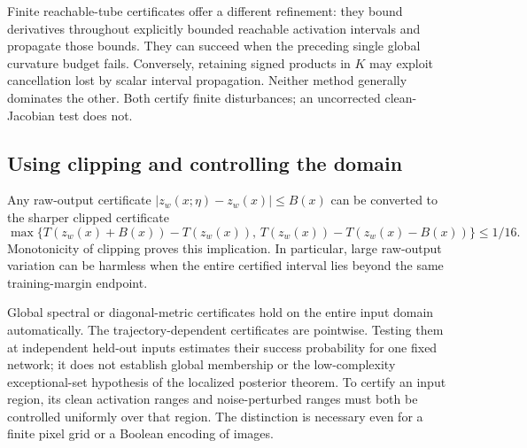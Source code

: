 Finite reachable-tube certificates offer a different refinement:
they bound derivatives throughout explicitly bounded reachable activation
intervals and propagate those bounds. They can succeed when the preceding
single global curvature budget fails. Conversely, retaining signed
products in $K$ may exploit cancellation lost by scalar interval
propagation. Neither method generally dominates the other. Both certify
finite disturbances; an uncorrected clean-Jacobian test does not.

\subsection{Using clipping and controlling the domain}

Any raw-output certificate $|z_w(x;\eta)-z_w(x)|\le B(x)$ can be
converted to the sharper clipped certificate
\[
 \max\{T(z_w(x)+B(x))-T(z_w(x)),\,
          T(z_w(x))-T(z_w(x)-B(x))\}\le1/16.
\]
Monotonicity of clipping proves this implication. In particular,
large raw-output variation can be harmless when the entire certified
interval lies beyond the same training-margin endpoint.

Global spectral or diagonal-metric certificates hold on the entire
input domain automatically. The trajectory-dependent certificates are
pointwise. Testing them at independent held-out inputs estimates their
success probability for one fixed network; it does not establish global
membership or the low-complexity exceptional-set hypothesis of the
localized posterior theorem. To certify an input region, its clean
activation ranges and noise-perturbed ranges must both be controlled
uniformly over that region. The distinction is necessary even for a
finite pixel grid or a Boolean encoding of images.
